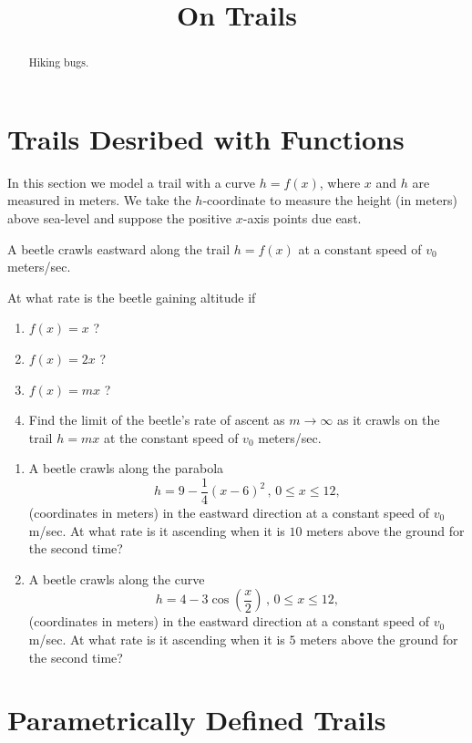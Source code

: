 \documentclass{ximera}
\title{On Trails}
\begin{document}
\begin{abstract}
Hiking bugs.
\end{abstract}
\maketitle

\section{Trails Desribed with Functions}

In this section we model a trail with a curve $h=f(x)$, where $x$ and $h$ are measured in meters. We take the $h$-coordinate to measure the height (in meters) above sea-level and suppose the positive $x$-axis points due east.

\begin{question}  \label{QOideIIEIEII}
A beetle crawls eastward along the trail $h = f(x)$ at a constant speed of $v_0$ meters/sec.

At what rate is the beetle gaining altitude if

\begin{enumerate}
\item $f(x) = x$ ?

\item $f(x)=2x$ ?

\item $f(x) = mx$ ? 

\item Find the limit of the beetle's rate of ascent as $m\to \infty$ as it crawls on the trail $h=mx$ at the constant speed of $v_0$ meters/sec.
\end{enumerate}
 
\end{question}

\begin{question}  \label{QPeriERE}
\begin{enumerate}

\item A beetle crawls along the parabola
\[
     h = 9-\frac{1}{4}\left(x-6\right)^{2} \, , \, 0\leq x \leq 12,
\]
(coordinates in meters) in the eastward direction at a constant speed of $v_0$ m/sec. At what rate is it ascending when it is $10$ meters above the ground for the second time?

\item A beetle crawls along the curve
\[
     h =4-3\cos\left(\frac{x}{2}\right) \, , \, 0\leq x \leq 12,
\]
(coordinates in meters) in the eastward direction at a constant speed of $v_0$ m/sec. At what rate is it ascending when it is $5$ meters above the ground for the second time?

\end{enumerate}

\end{question}




\section{Parametrically Defined Trails}
\end{document}
